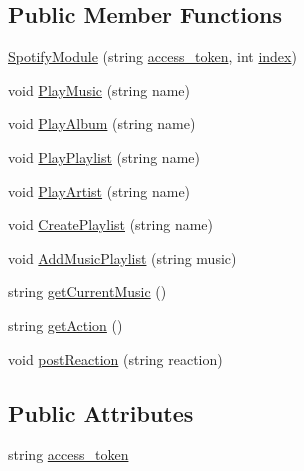 \subsection*{Public Member Functions}
\begin{DoxyCompactItemize}
\item 
\mbox{\hyperlink{classArea_1_1Models_1_1SpotifyModule_a8bf87195b9980a22f5183a05242cd18c}{Spotify\+Module}} (string \mbox{\hyperlink{classArea_1_1Models_1_1SpotifyModule_aff156c8f9328648cb5a505b7f98bc030}{access\+\_\+token}}, int \mbox{\hyperlink{classArea_1_1Models_1_1SpotifyModule_acef664652a467d8655e04497e88a7dc5}{index}})
\item 
void \mbox{\hyperlink{classArea_1_1Models_1_1SpotifyModule_aa47b97c81021848c70064a367c08805f}{Play\+Music}} (string name)
\item 
void \mbox{\hyperlink{classArea_1_1Models_1_1SpotifyModule_ae1358a3a515e5b3fbe8773cecfbc22ec}{Play\+Album}} (string name)
\item 
void \mbox{\hyperlink{classArea_1_1Models_1_1SpotifyModule_aa0fafbd764f8c309c80fb2f2c7d038f7}{Play\+Playlist}} (string name)
\item 
void \mbox{\hyperlink{classArea_1_1Models_1_1SpotifyModule_a6ca01223242bdb1c1427c881ce3507f4}{Play\+Artist}} (string name)
\item 
void \mbox{\hyperlink{classArea_1_1Models_1_1SpotifyModule_ab332e436227b77bc9d9938f29b22809d}{Create\+Playlist}} (string name)
\item 
void \mbox{\hyperlink{classArea_1_1Models_1_1SpotifyModule_a81dd73b8c192fb2c22359f53e435b226}{Add\+Music\+Playlist}} (string music)
\item 
string \mbox{\hyperlink{classArea_1_1Models_1_1SpotifyModule_a7125a2bf51f38f62cce6693ece4e1c2d}{get\+Current\+Music}} ()
\item 
string \mbox{\hyperlink{classArea_1_1Models_1_1SpotifyModule_ad506554a80eb35db2d6d9c251f38a5b7}{get\+Action}} ()
\item 
void \mbox{\hyperlink{classArea_1_1Models_1_1SpotifyModule_a54a02b412af1c23ffa05f0bc9c7bd228}{post\+Reaction}} (string reaction)
\end{DoxyCompactItemize}
\subsection*{Public Attributes}
\begin{DoxyCompactItemize}
\item 
string \mbox{\hyperlink{classArea_1_1Models_1_1SpotifyModule_aff156c8f9328648cb5a505b7f98bc030}{access\+\_\+token}}
\end{DoxyCompactItemize}
